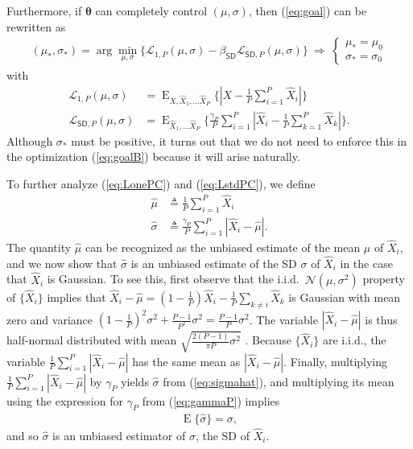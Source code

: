 \documentclass{article}
\theoremstyle{plain}
\theoremstyle{definition}
\theoremstyle{remark}
\renewcommand{\hat}{\widehat}
\newcommand{\defn}{\triangleq}
\renewcommand{\vec}[1]{\ensuremath{\boldsymbol{#1}}}
\newcommand{\mc}[1]{\ensuremath{\mathcal{#1}}}
\DeclareMathOperator{\E}{E}
\renewcommand{\eqref}[1]{(\ref{eq:#1})}
\newcommand{\ExxP}{\E_{X,\hat{X}_1,...\hat{X}_P}}
\newcommand{\ExP}{\E_{\hat{X}_1,...\hat{X}_P}}
\newcommand{\LoneP}{\mc{L}_{1,P}}
\newcommand{\LstdP}{\mc{L}_{\mathsf{SD},P}}
\newcommand{\betastd}{\beta_{\mathsf{SD}}}
\begin{document}
Furthermore, if $\vec{\theta}$ can completely control $(\mu,\sigma)$, then \eqref{goal} can be rewritten as
\begin{align} %
({\mu}_*,{\sigma}_*)
= \arg\min_{\mu,\sigma} \big\{ \LoneP(\mu,\sigma) - \betastd \LstdP(\mu,\sigma) \big\}
~\Rightarrow~
\begin{cases}
{\mu}_*=\mu_0 \\
{\sigma}_*=\sigma_0
\end{cases}
\label{eq:goalB}
\end{align}
with
\begin{align}
\LoneP(\mu,\sigma)
&= \textstyle \ExxP\{|X-\frac{1}{P}\sum_{i=1}^P \hat{X}_i|\} 
\label{eq:LonePC}\\
\LstdP(\mu,\sigma)
&= \textstyle \ExP\{\frac{\gamma_P}{P} \sum_{i=1}^P |\hat{X}_i-\frac{1}{P}\sum_{k=1}^P \hat{X}_k|\} 
\label{eq:LstdPC} .
\end{align}
Although $\sigma_*$ must be positive, it turns out that we do not need to enforce this in the optimization \eqref{goalB} because it will arise naturally.

To further analyze \eqref{LonePC} and \eqref{LstdPC}, we define 
\begin{align}
\hat{\mu} &\defn \textstyle \frac{1}{P}\sum_{i=1}^P \hat{X}_i\\
\hat{\sigma} &\defn \textstyle \frac{\gamma_P}{P} \sum_{i=1}^P |\hat{X}_i - \hat{\mu}|
\label{eq:sigmahat} .
\end{align}
The quantity $\hat{\mu}$ can be recognized as the unbiased estimate of the mean $\mu$ of $\hat{X}_i$, and we now show that $\hat{\sigma}$ is an unbiased estimate of the SD $\sigma$ of $\hat{X}_i$ in the case that $\hat{X}_i$ is Gaussian.
To see this, first observe that the i.i.d.\ $\mc{N}(\mu,\sigma^2)$ property of $\{\hat{X}_i\}$ implies that $\hat{X}_i-\hat{\mu}=(1-\frac{1}{P})\hat{X}_i-\frac{1}{P}\sum_{k\neq i}\hat{X}_k$ is Gaussian with mean zero and variance $(1-\frac{1}{P})^2\sigma^2 + \frac{P-1}{P^2}\sigma^2 = \frac{P-1}{P}\sigma^2$.
The variable $|\hat{X}_i-\hat{\mu}|$ is thus half-normal distributed with mean $\sqrt{\frac{2(P-1)}{\pi P}\sigma^2}$ \cite{Leone:Techno:61}.
Because $\{\hat{X}_i\}$ are i.i.d., the variable $\frac{1}{P}\sum_{i=1}^P|\hat{X}_i-\hat{\mu}|$ has the same mean as $|\hat{X}_i-\hat{\mu}|$.
Finally, multiplying $\frac{1}{P}\sum_{i=1}^P|\hat{X}_i-\hat{\mu}|$ by $\gamma_P$ yields $\hat{\sigma}$ from \eqref{sigmahat}, and multiplying its mean using the expression for $\gamma_P$ from \eqref{gammaP} implies 
\begin{align}
\E\{\hat{\sigma}\} = \sigma ,
\end{align}
and so $\hat{\sigma}$ is an unbiased estimator of $\sigma$, the SD of $\hat{X}_i$.
\end{document}
